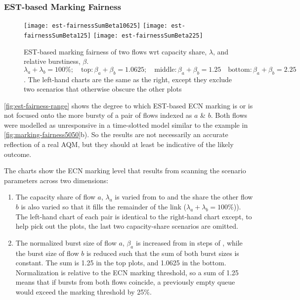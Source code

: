 \subsubsection{EST-based Marking Fairness}\label{sec:marking_fairness_expts_est}

\begin{figure*}[t!]
	\centering
	\texttt{[image: est-fairnessSumBeta10625]}
	\texttt{[image: est-fairnessSumBeta125]}
	\texttt{[image: est-fairnessSumBeta225]}
	\caption{EST-based marking fairness of two flows wrt capacity share, \(\lambda\), and relative burstiness, \(\beta\).\\
	\(\lambda_a+\lambda_b=100\%; \quad\mathrm{top:} \beta_a+\beta_b=1.0625; \quad\mathrm{middle:} \beta_a+\beta_b=1.25 
	\quad\mathrm{bottom:} \beta_a+\beta_b=2.25\). 
	The left-hand charts are the same as the right, except they exclude two scenarios that otherwise obscure the other plots}\label{fig:est-fairness-range}
\end{figure*}

\autoref{fig:est-fairness-range} shows the degree to which EST-based ECN marking is or is not focused onto the more bursty of a pair of flows indexed as \(a\) \& \(b\). Both flows were modelled as unresponsive in a time-slotted model similar to the example in \autoref{fig:marking-fairness5050}b). So the results are not necessarily an accurate reflection of a real AQM, but they should at least be indicative of the likely outcome.

The charts show the ECN marking level that results from scanning the scenario parameters across two dimensions:
\begin{enumerate}
	\item The capacity share of flow \(a\), \(\lambda_a\) is varied from  to  and the share the other flow \(b\) is also varied so that it fills the remainder of the link (\(\lambda_a+\lambda_b=100\%\))). The left-hand chart of each pair is identical to the right-hand chart except, to help pick out the plots, the last two capacity-share scenarios are omitted.
	\item The normalized burst size of flow \(a\), \(\beta_a\) is increased from  in steps of , while the burst size of flow \(b\) is reduced such that the sum of both burst sizes is constant. The sum is 1.25 in the top plots, and 1.0625 in the bottom. 	Normalization is relative to the ECN marking threshold, so a sum of 1.25 means that if bursts from both flows coincide, a previously empty queue would exceed the marking threshold by 25\%.
\end{enumerate}

